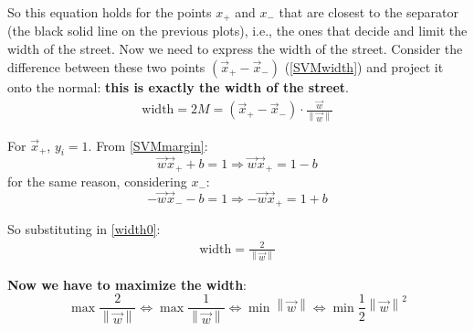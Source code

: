 \documentclass[12pt, letterpaper]{article}
\theoremstyle{definition}
\newcommand\norm[1]{\left\lVert#1\right\rVert}
\let\tb\textbf
\begin{document}
So this equation holds for the points $x_+$ and $x_-$ that are closest to the separator (the black solid line on the previous plots), i.e., the ones that decide and limit the width of the street. Now we need to express the width of the street. Consider the difference between these two points $(\vec{x}_+ - \vec{x}_-)$ (\ref{SVMwidth}) and project it onto the normal: \textbf{this is exactly the width of the street}.
\begin{equation}
\begin{aligned}
\text{width} = 2M = \left( \vec{x}_+ - \vec{x}_-\right) \cdot \frac{\vec{w}}{\norm{\vec{w}}}
\end{aligned}
\label{width0}
\end{equation}

For $\vec{x}_+$, $y_i=1$. From \ref{SVMmargin}:
\begin{equation}
\vec{w} \vec{x}_+ + b = 1\Rightarrow \vec{w} \vec{x}_+ = 1-b
\end{equation}
for the same reason, considering $x_-$:
\begin{equation}
-\vec{w} \vec{x}_- - b = 1\Rightarrow -\vec{w} \vec{x}_+ = 1+b
\end{equation}

So substituting in \ref{width0}:
\begin{equation}
\begin{aligned}
\text{width} = \frac{2}{\norm{\vec{w}}}
\end{aligned}
\label{width1}
\end{equation}

\tb{Now we have to maximize the width}:
\begin{equation}
\max \frac{2}{\norm{\vec{w}}} \Leftrightarrow \max \frac{1}{\norm{\vec{w}}} \Leftrightarrow\min \norm{\vec{w}} \Leftrightarrow \min \frac{1}{2} \norm{\vec{w}}^2
\label{SVMmin}
\end{equation}
\end{document}
